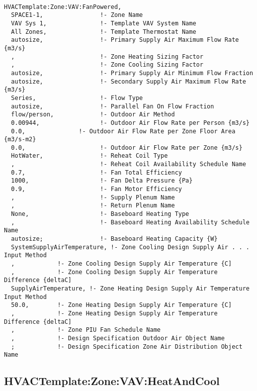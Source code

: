 \begin{lstlisting}

HVACTemplate:Zone:VAV:FanPowered,
  SPACE1-1,                !- Zone Name
  VAV Sys 1,               !- Template VAV System Name
  All Zones,               !- Template Thermostat Name
  autosize,                !- Primary Supply Air Maximum Flow Rate {m3/s}
  ,                        !- Zone Heating Sizing Factor
  ,                        !- Zone Cooling Sizing Factor
  autosize,                !- Primary Supply Air Minimum Flow Fraction
  autosize,                !- Secondary Supply Air Maximum Flow Rate {m3/s}
  Series,                  !- Flow Type
  autosize,                !- Parallel Fan On Flow Fraction
  flow/person,             !- Outdoor Air Method
  0.00944,                 !- Outdoor Air Flow Rate per Person {m3/s}
  0.0,               !- Outdoor Air Flow Rate per Zone Floor Area {m3/s-m2}
  0.0,                     !- Outdoor Air Flow Rate per Zone {m3/s}
  HotWater,                !- Reheat Coil Type
  ,                        !- Reheat Coil Availability Schedule Name
  0.7,                     !- Fan Total Efficiency
  1000,                    !- Fan Delta Pressure {Pa}
  0.9,                     !- Fan Motor Efficiency
  ,                        !- Supply Plenum Name
  ,                        !- Return Plenum Name
  None,                    !- Baseboard Heating Type
  ,                        !- Baseboard Heating Availability Schedule Name
  autosize;                !- Baseboard Heating Capacity {W}
  SystemSupplyAirTemperature, !- Zone Cooling Design Supply Air . . . Input Method
  ,            !- Zone Cooling Design Supply Air Temperature {C]
  ,            !- Zone Cooling Design Supply Air Temperature Difference {deltaC]
  SupplyAirTemperature, !- Zone Heating Design Supply Air Temperature Input Method
  50.0,        !- Zone Heating Design Supply Air Temperature {C]
  ,            !- Zone Heating Design Supply Air Temperature Difference {deltaC]
  ,            !- Zone PIU Fan Schedule Name
  ,            !- Design Specification Outdoor Air Object Name
  ;            !- Design Specification Zone Air Distribution Object Name
\end{lstlisting}

\subsection{HVACTemplate:Zone:VAV:HeatAndCool}\label{hvactemplatezonevavheatandcool}

